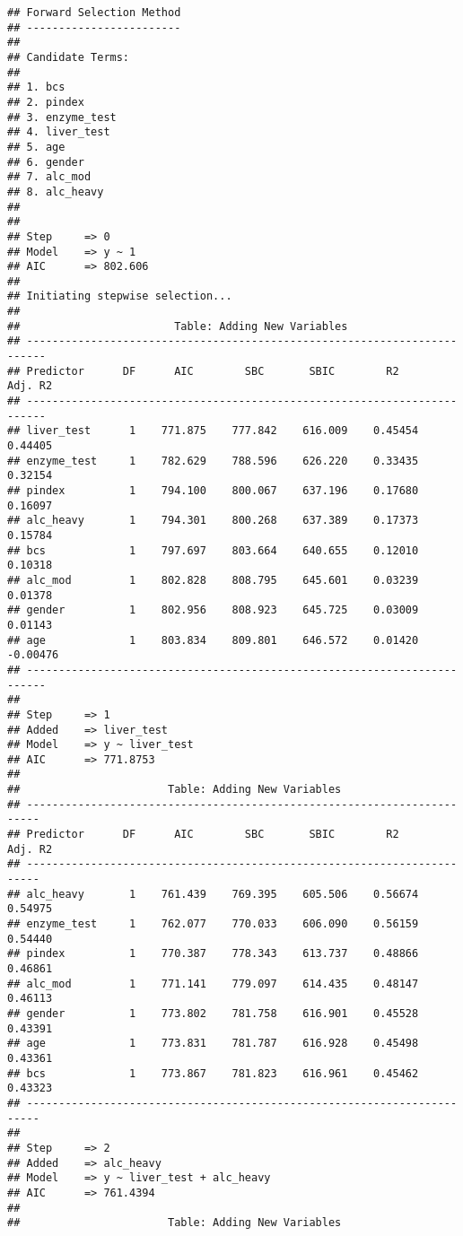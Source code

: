 \documentclass[
]{article}
\begin{document}
\begin{verbatim}
## Forward Selection Method 
## ------------------------
## 
## Candidate Terms: 
## 
## 1. bcs 
## 2. pindex 
## 3. enzyme_test 
## 4. liver_test 
## 5. age 
## 6. gender 
## 7. alc_mod 
## 8. alc_heavy 
## 
## 
## Step     => 0 
## Model    => y ~ 1 
## AIC      => 802.606 
## 
## Initiating stepwise selection... 
## 
##                        Table: Adding New Variables                        
## -------------------------------------------------------------------------
## Predictor      DF      AIC        SBC       SBIC        R2       Adj. R2  
## -------------------------------------------------------------------------
## liver_test      1    771.875    777.842    616.009    0.45454     0.44405 
## enzyme_test     1    782.629    788.596    626.220    0.33435     0.32154 
## pindex          1    794.100    800.067    637.196    0.17680     0.16097 
## alc_heavy       1    794.301    800.268    637.389    0.17373     0.15784 
## bcs             1    797.697    803.664    640.655    0.12010     0.10318 
## alc_mod         1    802.828    808.795    645.601    0.03239     0.01378 
## gender          1    802.956    808.923    645.725    0.03009     0.01143 
## age             1    803.834    809.801    646.572    0.01420    -0.00476 
## -------------------------------------------------------------------------
## 
## Step     => 1 
## Added    => liver_test 
## Model    => y ~ liver_test 
## AIC      => 771.8753 
## 
##                       Table: Adding New Variables                        
## ------------------------------------------------------------------------
## Predictor      DF      AIC        SBC       SBIC        R2       Adj. R2 
## ------------------------------------------------------------------------
## alc_heavy       1    761.439    769.395    605.506    0.56674    0.54975 
## enzyme_test     1    762.077    770.033    606.090    0.56159    0.54440 
## pindex          1    770.387    778.343    613.737    0.48866    0.46861 
## alc_mod         1    771.141    779.097    614.435    0.48147    0.46113 
## gender          1    773.802    781.758    616.901    0.45528    0.43391 
## age             1    773.831    781.787    616.928    0.45498    0.43361 
## bcs             1    773.867    781.823    616.961    0.45462    0.43323 
## ------------------------------------------------------------------------
## 
## Step     => 2 
## Added    => alc_heavy 
## Model    => y ~ liver_test + alc_heavy 
## AIC      => 761.4394 
## 
##                       Table: Adding New Variables                        

\end{verbatim}
\end{document}
